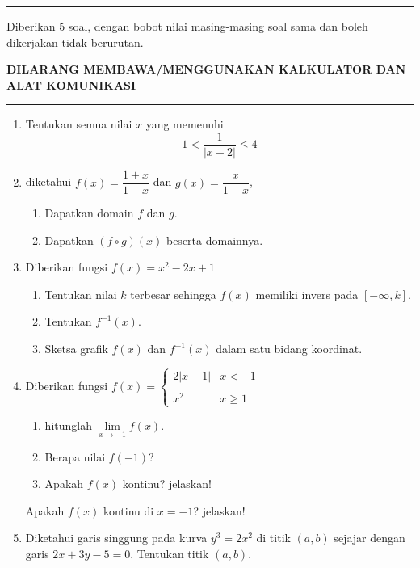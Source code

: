 \documentclass[10pt,openany,a4paper]{article}
\begin{document}
    \noindent\rule{\textwidth}{2.pt}
	
    \setlength{\parindent}{5pt}
    \par Diberikan 5 soal, dengan bobot nilai masing-masing soal sama dan boleh dikerjakan tidak berurutan.
    \setlength{\parindent}{5pt}
    \setlength{\parindent}{5pt}
    {\small
    \par \textbf{\MakeUppercase{Dilarang membawa/menggunakan kalkulator dan alat komunikasi}}
    }
    \par {}
	
    \noindent\rule{\textwidth}{2.pt}
	
    \begin{enumerate}
	\item Tentukan semua nilai $x$ yang memenuhi
        \[1<\frac{1}{|x-2|}\leq4\]

        \item diketahui $f(x)=\dfrac{1+x}{1-x}$ dan $g(x)=\dfrac{x}{1-x}$,
        \begin{enumerate}
            \item Dapatkan domain $f$ dan $g$.
            \item Dapatkan $(f\circ g)(x)$ beserta domainnya.
        \end{enumerate}

        \item Diberikan fungsi $f(x)=x^2-2x+1$
        \begin{enumerate}
            \item Tentukan nilai $k$ terbesar sehingga $f(x)$ memiliki invers pada $[-\infty,k]$.
            \item Tentukan $f^{-1}(x)$.
            \item Sketsa grafik $f(x)$ dan $f^{-1}(x)$ dalam satu bidang koordinat.
        \end{enumerate}

        \item Diberikan fungsi $f(x)=\begin{cases}
        2|x+1|&   x < -1\\
        \\
        x^2 &   x \geq 1
        \end{cases}$
        \begin{enumerate}
            \item hitunglah $\lim\limits_{x\to-1}f(x)$.
            \item Berapa nilai $f(-1)$?
            \item Apakah $f(x)$ kontinu? jelaskan!
        \end{enumerate}
        Apakah $f(x)$ kontinu di $x=-1$? jelaskan!

        \item Diketahui garis singgung pada kurva $y^3=2x^2$ di titik $(a,b)$ sejajar dengan garis $2x+3y-5=0$. Tentukan titik $(a,b)$.
    \end{enumerate}
	
\end{document}
